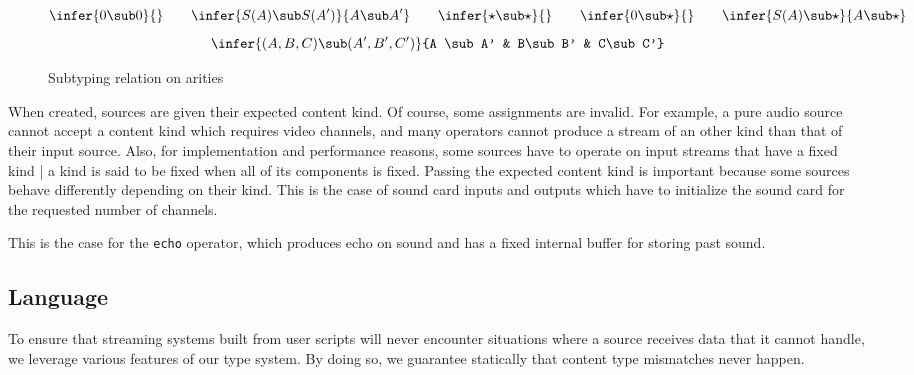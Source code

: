 \begin{figure}[htpb]
\[
   \infer{0\sub 0}{} \quad\quad
   \infer{S(A)\sub S(A')}{A\sub A'} \quad\quad
   \infer{\star\sub\star}{} \quad\quad
   \infer{0\sub \star}{} \quad\quad
   \infer{S(A)\sub \star}{A\sub\star}
\]\[
   \infer{(A,B,C) \sub (A',B',C')}{A \sub A' & B\sub B' & C\sub C'}
\]
 \caption{Subtyping relation on arities}
 \label{fig:subtyping}
\end{figure}

When created, sources are given their expected content kind.
Of course, some assignments are invalid.
For example,
a pure audio source cannot accept a content kind which requires video 
channels, and many operators cannot produce a stream of an other kind
than that of their input source.
Also, for implementation and performance reasons, some sources have
to operate on input streams that have a fixed kind |
a kind is said to be fixed when all of its components is fixed.
Passing the expected content kind is important because some sources
behave differently depending on their kind.
This is the case
of sound card inputs and outputs which have to initialize the sound card
for the requested number of channels.

This is the case for the \texttt{echo} operator,
which produces echo on sound and has a fixed internal buffer for storing past
sound.

\subsection{Language}

To ensure that streaming systems built from user scripts will never
encounter situations where a source receives data that it cannot handle,
we leverage various features of our type system.
By doing so, we guarantee statically that content type mismatches never happen.

